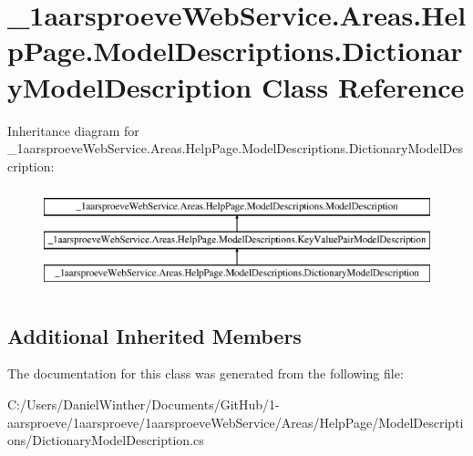 \hypertarget{class__1aarsproeve_web_service_1_1_areas_1_1_help_page_1_1_model_descriptions_1_1_dictionary_model_description}{}\section{\+\_\+1aarsproeve\+Web\+Service.\+Areas.\+Help\+Page.\+Model\+Descriptions.\+Dictionary\+Model\+Description Class Reference}
\label{class__1aarsproeve_web_service_1_1_areas_1_1_help_page_1_1_model_descriptions_1_1_dictionary_model_description}
Inheritance diagram for \+\_\+1aarsproeve\+Web\+Service.\+Areas.\+Help\+Page.\+Model\+Descriptions.\+Dictionary\+Model\+Description\+:\begin{figure}[H]
\begin{center}
\leavevmode
\includegraphics[height=3.000000cm]{class__1aarsproeve_web_service_1_1_areas_1_1_help_page_1_1_model_descriptions_1_1_dictionary_model_description}
\end{center}
\end{figure}
\subsection*{Additional Inherited Members}


The documentation for this class was generated from the following file\+:\begin{DoxyCompactItemize}
\item 
C\+:/\+Users/\+Daniel\+Winther/\+Documents/\+Git\+Hub/1-\/aarsproeve/1aarsproeve/1aarsproeve\+Web\+Service/\+Areas/\+Help\+Page/\+Model\+Descriptions/Dictionary\+Model\+Description.\+cs\end{DoxyCompactItemize}

